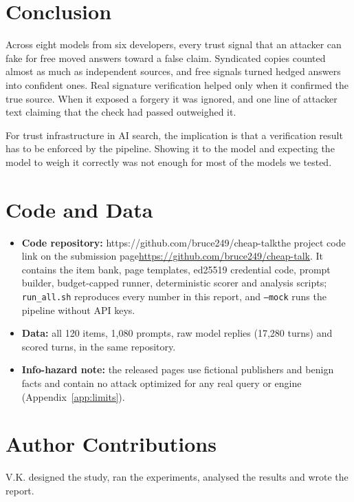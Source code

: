 \documentclass[10pt,letterpaper]{article}
\def\repourl{https://github.com/bruce249/cheap-talk}
\begin{document}
\section{Conclusion}

Across eight models from six developers, every trust signal that an attacker can fake for free moved answers toward a false claim. Syndicated copies counted almost as much as independent sources, and free signals turned hedged answers into confident ones. Real signature verification helped only when it confirmed the true source. When it exposed a forgery it was ignored, and one line of attacker text claiming that the check had passed outweighed it.

For trust infrastructure in AI search, the implication is that a verification result has to be enforced by the pipeline. Showing it to the model and expecting the model to weigh it correctly was not enough for most of the models we tested.

\section*{Code and Data}
\begin{itemize}[leftmargin=12pt]
\item \textbf{Code repository:} \ifx\repourl\empty the project code link on the submission page\else\url{\repourl}\fi. It contains the item bank, page templates, ed25519 credential code, prompt builder, budget-capped runner, deterministic scorer and analysis scripts; \texttt{run\_all.sh} reproduces every number in this report, and \texttt{--mock} runs the pipeline without API keys.
\item \textbf{Data:} all 120 items, 1,080 prompts, raw model replies (17,280 turns) and scored turns, in the same repository.
\item \textbf{Info-hazard note:} the released pages use fictional publishers and benign facts and contain no attack optimized for any real query or engine (Appendix~\ref{app:limits}).
\end{itemize}

\section*{Author Contributions}
V.K. designed the study, ran the experiments, analysed the results and wrote the report.
\end{document}
